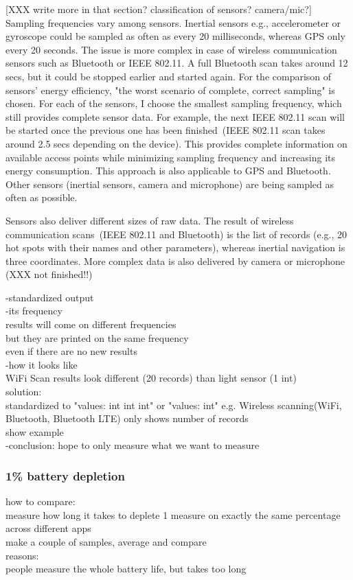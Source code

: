 [XXX write more in that section? classification of sensors? camera/mic?]
Sampling frequencies vary among sensors. Inertial sensors e.g., accelerometer or gyroscope could be sampled as often as every 20 milliseconds, whereas GPS only every 20 seconds. The issue is more complex in case of wireless communication sensors such as Bluetooth or IEEE 802.11. A full Bluetooth scan takes around 12 secs, but it could be stopped earlier and started again. For the comparison of sensors' energy efficiency, "the worst scenario of complete, correct sampling" is chosen. For each of the sensors, I choose the smallest sampling frequency, which still provides complete sensor data. For example, the next IEEE 802.11 scan will be started once the previous one has been finished\ (IEEE 802.11 scan takes around 2.5 secs depending on the device). This provides complete information on available access points while minimizing sampling frequency and increasing its energy consumption. This approach is also applicable to GPS and Bluetooth. Other sensors (inertial sensors, camera and microphone) are being sampled as often as possible.

Sensors also deliver different sizes of raw data. The result of wireless communication scans\ (IEEE 802.11 and Bluetooth) is the list of records (e.g., 20 hot spots with their names and other parameters), whereas inertial navigation is three coordinates. More complex data is also delivered by camera or microphone (XXX not finished!!)
					
		-standardized output\\
				-its frequency\\
					results will come on different frequencies\\
					but they are printed on the same frequency\\
						even if there are no new results\\
				-how it looks like\\
					WiFi Scan results look different (20 records) than light sensor (1 int)\\
					solution:\\
						standardized to "values: int int int" or "values: int"
							e.g. Wireless scanning(WiFi, Bluetooth, Bluetooth LTE) only shows number of records\\
							show example\\	
		-conclusion: hope to only measure what we want to measure\\				
				
\subsubsection{1\% battery depletion}	
\label{s:design:measurements:method}			
how to compare:\\
	measure how long it takes to deplete 1%
		measure on exactly the same percentage across different apps\\
		make a couple of samples, average and compare\\
		reasons:\\
			people measure the whole battery life, but takes too long\\
			

